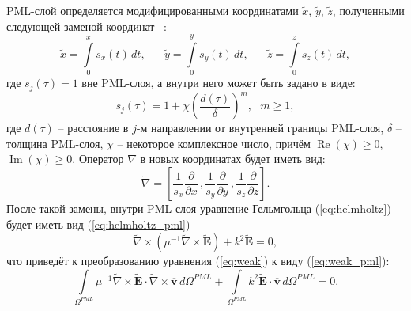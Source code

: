 \documentclass[a4paper,14pt]{article}
\renewcommand{\Re}{\mathop{\mathrm{Re}}\nolimits}
\renewcommand{\Im}{\mathop{\mathrm{Im}}\nolimits}
\begin{document}
PML-слой определяется модифицированными координатами $\tilde{x}$, $\tilde{y}$, $\tilde{z}$, полученными следующей заменой координат ~\citep{wiik_dehoop_ursin}:
\begin{equation*}
	\tilde{x} = \int\limits_0^x s_x (t) \,dt ,
	\text{~~~~~}
	\tilde{y} = \int\limits_0^y s_y (t) \,dt ,
	\text{~~~~~}
	\tilde{z} = \int\limits_0^z s_z (t) \,dt ,
\end{equation*}
где $s_j(\tau) = 1$ вне PML-слоя, а внутри него может быть задано в виде:
\begin{equation}
	s_j(\tau) = 1 + \chi \left( \frac{d(\tau)}{\delta} \right)^m , \text{~~} m \geq 1 ,
	\label{eq:pml_s}
\end{equation}
где $d(\tau)$ -- расстояние в $j$-м направлении от внутренней границы PML-слоя, $\delta$ -- толщина PML-слоя, $\chi$ -- некоторое комплексное число, причём $\Re(\chi) \ge 0$, $\Im(\chi) \ge 0$. Оператор $\nabla$ в новых координатах будет иметь вид:
\begin{equation*}
	\tilde{\nabla} = \left[ \frac{1}{s_x} \frac{\partial}{\partial x} \,, \frac{1}{s_y} \frac{\partial}{\partial y} \,, \frac{1}{s_z} \frac{\partial}{\partial z} \right] .
\end{equation*}
После такой замены, внутри PML-слоя уравнение Гельмгольца (\ref{eq:helmholtz}) будет иметь вид (\ref{eq:helmholtz_pml})
\begin{equation}
	\tilde{\nabla} \times ( \mu^{-1} \tilde{\nabla} \times \tilde{\mathbf{E}} ) + k^{2} \tilde{\mathbf{E}} = 0 , \label{eq:helmholtz_pml}
\end{equation}
что приведёт к преобразованию уравнения (\ref{eq:weak}) к виду (\ref{eq:weak_pml}):
\begin{equation}
	\int\limits_{{\Omega^{PML}}} \mu^{-1} \tilde{\nabla} \times \tilde{\mathbf{E}} \cdot \tilde{\nabla} \times \overline{\mathbf{v}} \,d{\Omega^{PML}} + \int\limits_{{\Omega^{PML}}} k^{2} \tilde{\mathbf{E}} \cdot \overline{\mathbf{v}} \,d{\Omega^{PML}} = 0 . \label{eq:weak_pml}
\end{equation}
\end{document}

